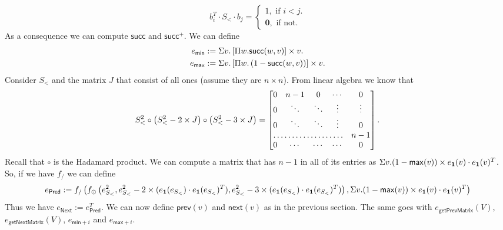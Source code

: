 $$
b_i^T\cdot S_{<} \cdot b_j=\begin{cases}
               1, \text{ if } i < j.\\
              \mathbf{0}, \text{ if not.}
            \end{cases}
$$
As a consequence we
can compute $\mathsf{succ}$ and $\mathsf{succ}^+$. We can define
\begin{align*}
  e_{\mathsf{min}}&:=\Sigma v. \left[ \Pi w. \mathsf{succ}(w,v)\right] \times v. \\
  e_{\mathsf{max}}&:=\Sigma v. \left[ \Pi w. \left( 1-\mathsf{succ}(w,v) \right) \right] \times v.
\end{align*}
Consider $S_<$ and the matrix $J$ that consist of all ones (assume they are $n\times n$). From linear algebra we know that
\[
S_<^2 \circ \left( S_{<}^2-2\times J\right) \circ \left( S_{<}^2-3\times J\right) = \begin{bmatrix}
    0 & n-1 & 0 & \cdots &  0 \\
    0 & \ddots & \ddots & \vdots & \vdots \\
    0 & \ddots & \ddots & \vdots & 0\\
    \hdotsfor{4} & n-1 \\
    0 & \cdots & \cdots & \cdots & 0 
\end{bmatrix}.
\]
Recall that $\circ$ is the Hadamard product. We can compute a matrix that has $n-1$ in
all of its entries as $\Sigma v.(1-\mathsf{max}(v))\times e_{\mathbf{1}}(v)\cdot e_{\mathbf{1}}(v)^T$.
So, if we have $f_{/}$ we can define
$$
e_{\mathsf{Pred}}:= f_{/}\left( f_{\odot}\left(e_{S_{<}}^2, e_{S_{<}}^2-2\times (e_{\mathbf{1}}(e_{S_{<}})\cdot e_{\mathbf{1}}(e_{S_{<}})^T), e_{S_{<}}^2-3\times (e_{\mathbf{1}}(e_{S_{<}})\cdot e_{\mathbf{1}}(e_{S_{<}})^T) \right),\Sigma v.(1-\mathsf{max}(v))\times e_{\mathbf{1}}(v)\cdot e_{\mathbf{1}}(v)^T\right) 
$$
Thus we have $e_{\mathsf{Next}}:=e_{\mathsf{Pred}}^T$.
We can now define $\mathsf{prev}(v)$ and $\mathsf{next}(v)$ as in the previous section. 
The same goes with $e_{\mathsf{getPrevMatrix}}(V)$, 
$e_{\mathsf{getNextMatrix}}(V)$, $e_{\mathsf{min}+i}$ and $e_{\mathsf{max}+i}$.



